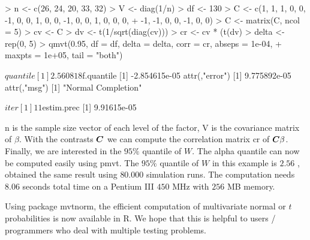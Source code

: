 \documentclass[11pt]{amsart}
\newcommand{\C}{\mbox{\boldmath $C$}}
\begin{document}
\begin{Schunk}
\begin{Sinput}
> n <- c(26, 24, 20, 33, 32)
> V <- diag(1/n)
> df <- 130
> C <- c(1, 1, 1, 0, 0, -1, 0, 0, 1, 0, 0, -1, 0, 0, 1, 0, 0, 0, 
+     -1, -1, 0, 0, -1, 0, 0)
> C <- matrix(C, ncol = 5)
> cv <- C %*% V %*% t(C)
> dv <- t(1/sqrt(diag(cv)))
> cr <- cv * (t(dv) %*% dv)
> delta <- rep(0, 5)
> qmvt(0.95, df = df, delta = delta, corr = cr, abseps = 1e-04, 
+     maxpts = 1e+05, tail = "both")
\end{Sinput}
\begin{Soutput}
$quantile
[1] 2.560818

$f.quantile
[1] -2.854615e-05
attr(,"error")
[1] 9.775892e-05
attr(,"msg")
[1] "Normal Completion"

$iter
[1] 11

$estim.prec
[1] 9.91615e-05
\end{Soutput}
\end{Schunk}
{\ttfamily n} is the sample size vector of each level of the
factor, {\ttfamily V} is the covariance matrix of $ \beta $. With
the contrasts $ \C $ we can compute the correlation matrix
{\ttfamily cr} of $ \C\beta $. Finally, we are interested in the
$ 95\%$ quantile of $ W $. The {\ttfamily
alpha} quantile can now be computed easily using {\ttfamily
pmvt}. The $95\%$ quantile of $ W $ in this example is $ 2.56 $
, \cite{the-effici:1987} obtained the same result using $ 80.000
$ simulation runs. The computation needs $ 8.06 $ seconds total
time on a Pentium III $450$ MHz with $256$ MB memory.

Using package {\ttfamily mvtnorm}, the efficient computation of
multivariate normal or $ t $ probabilities is now available
in {\ttfamily R}. We hope that this is helpful to users / programmers who
deal with multiple testing problems.



\end{document}
